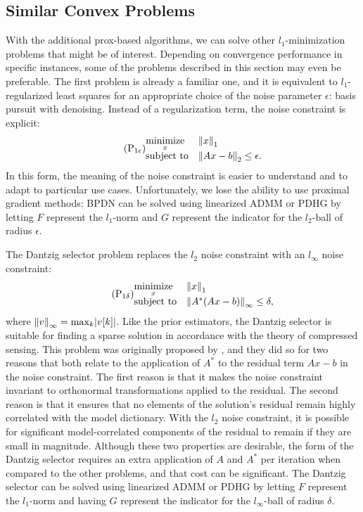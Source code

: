 \subsection{Similar Convex Problems}
\label{similar_convex_problems}
With the additional prox-based algorithms, we can solve other $l_1$-minimization problems that might be of interest. Depending on convergence performance in specific instances, some of the problems described in this section may even be preferable. The first problem is already a familiar one, and it is equivalent to $l_1$-regularized least squares for an appropriate choice of the noise parameter $\epsilon$: basis pursuit with denoising. Instead of a regularization term, the noise constraint is explicit:
\begin{equation*}\tag{$\text{P}_{\text{1}\epsilon}$}
 \begin{matrix*}[l]
  \underset{x}{\mathrm{minimize}} & \norm{1}{x}\\
  \text{subject to} & \norm{2}{Ax - b} \le \epsilon.
 \end{matrix*}
\end{equation*}
In this form, the meaning of the noise constraint is easier to understand and to adapt to particular use cases. Unfortunately, we lose the ability to use proximal gradient methods: BPDN can be solved using linearized ADMM or PDHG by letting $F$ represent the $l_1$-norm and $G$ represent the indicator for the $l_2$-ball of radius $\epsilon$.

The Dantzig selector problem replaces the $l_2$ noise constraint with an $l_\infty$ noise constraint:
\begin{equation*}\tag{$\text{P}_{\text{1}\delta}$}
 \begin{matrix*}[l]
  \underset{x}{\mathrm{minimize}} & \norm{1}{x}\\
  \text{subject to} & \norm{\infty}{A^*(Ax - b)} \le \delta,
 \end{matrix*}
\end{equation*}
where $\norm{\infty}{v} = \max_k \abs*{v[k]}$. Like the prior estimators, the Dantzig selector is suitable for finding a sparse solution in accordance with the theory of compressed sensing. This problem was originally proposed by \textcite{CT07}, and they did so for two reasons that both relate to the application of $A^*$ to the residual term $Ax - b$ in the noise constraint. The first reason is that it makes the noise constraint invariant to orthonormal transformations applied to the residual. The second reason is that it ensures that no elements of the solution's residual remain highly correlated with the model dictionary. With the $l_2$ noise constraint, it is possible for significant model-correlated components of the residual to remain if they are small in magnitude. Although these two properties are desirable, the form of the Dantzig selector requires an extra application of $A$ and $A^*$ per iteration when compared to the other problems, and that cost can be significant. The Dantzig selector can be solved using linearized ADMM or PDHG by letting $F$ represent the $l_1$-norm and having $G$ represent the indicator for the $l_\infty$-ball of radius $\delta$.

